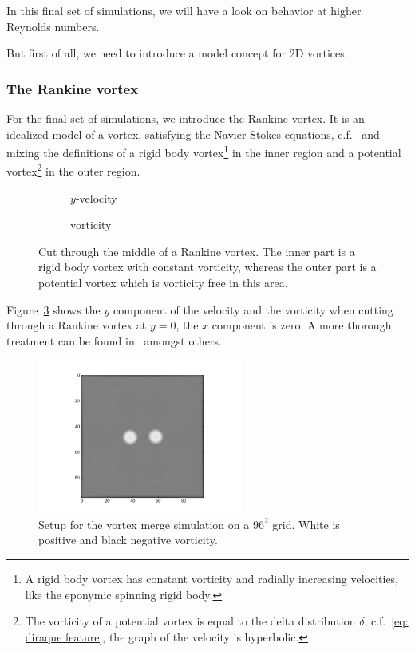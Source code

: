 
In this final set of simulations, we will have a look on behavior at higher Reynolds numbers.

But first of all, we need to introduce a model concept for 2D vortices.

\subsubsection{The Rankine vortex}
\label{subs:The Rankine vortex}

For the final set of simulations, we introduce the Rankine-vortex.
It is an idealized model of a vortex, satisfying the Navier-Stokes equations, c.f.~\cite{tryggeson2007analytical} and mixing the definitions of a rigid body vortex\footnote{A rigid body vortex has constant vorticity and radially increasing velocities, like the eponymic spinning rigid body.}
in the inner region and a potential vortex\footnote{The vorticity of a potential vortex is equal to the delta distribution $\delta$, c.f.~\eqref{eq: diraque feature}, the graph of the velocity is hyperbolic.} in the outer region.


\begin{figure}[h!]
\centering
\begin{subfigure}[b]{.5\textwidth}
  \centering
  
  \caption{$y$-velocity}
\label{fig: rankine velocity}
\end{subfigure}%
\begin{subfigure}[b]{.5\textwidth}
  \centering
  
  \caption{vorticity}
\label{fig: rankine vorticity}
\end{subfigure}
\caption{Cut through the middle of a Rankine vortex.
The inner part is a rigid body vortex with constant vorticity, whereas the outer part is a potential vortex which is vorticity free in this area.}
\label{fig: rankine}
\end{figure}

Figure~\ref{fig: rankine} shows the $y$ component of the velocity and the vorticity when cutting through a Rankine vortex at $y=0$, the $x$ component is zero.
A more thorough treatment can be found in~\cite{giaiotti2006rankine} amongst others.

\begin{figure}
  \centering
  \includegraphics[width=0.6\textwidth]{../figures/rankine_vortex.png}  %
  \caption{Setup for the vortex merge simulation on a $96^2$ grid. White is positive and black negative vorticity.}
\label{fig: vortex merge setup}
\end{figure}

